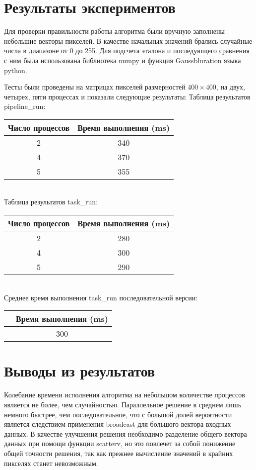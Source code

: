 \documentclass[14pt]{article}
\begin{document}
\section{Результаты экспериментов}
Для проверки правильности работы алгоритма были вручную заполнены небольшие векторы пикселей. В качестве начальных значений брались случайные числа в диапазоне от 0 до 255. Для подсчета эталона и последующего сравнения с ним была использована библиотека numpy и функция Gaussbluration языка python. 

Тесты были проведены на матрицах пикселей размерностей $400 \times 400$, на двух, четырех, пяти процессах и показали следующие результаты:
Таблица результатов pipeline\_run:\\[0,5cm]
\begin{tabular}{|c|c|}
    \hline
    Число процессов   & Время выполнения (ms)  \\ \hline
    2               & 340                   \\ \hline
    4                &370                   \\ \hline
    5                &355                      \\ \hline
\end{tabular}\\[1cm]

Таблица результатов task\_run:\\[0,5cm]
\begin{tabular}{|c|c|}
    \hline
    Число процессов   & Время выполнения (ms)  \\ \hline
    2               & 280                   \\ \hline
    4                & 300                \\ \hline
    5                & 290                     \\ \hline
\end{tabular}\\[1cm]

Среднее время выполнения task\_run последовательной версии:\\[0,5cm]
\begin{tabular}{|c|c|}
    \hline
  & Время выполнения (ms)  \\ \hline
  & 300                   \\ \hline
\end{tabular}
\section{Выводы из результатов}
Колебание времени исполнения алгоритма на небольшом количестве процессов является не более, чем случайностью. Параллельное решение в среднем лишь немного быстрее, чем последовательное, что с большой долей вероятности является следствием применения broadcast для большого вектора входных данных. В качестве улучшения решения необходимо разделение общего вектора данных при помощи функции scatterv, но это повлечет за собой понижение общей точности решения, так как прежнее вычисление значений в крайних пикселях станет невозможным. 
\end{document}
